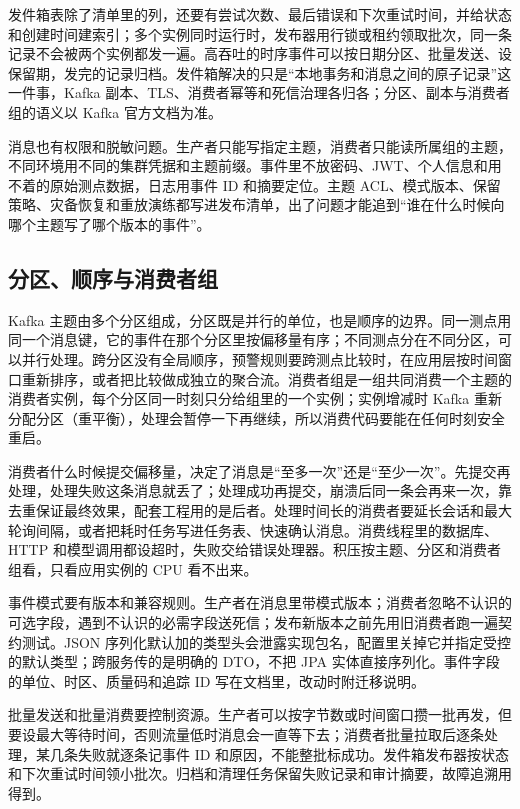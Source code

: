 发件箱表除了清单里的列，还要有尝试次数、最后错误和下次重试时间，并给状态和创建时间建索引；多个实例同时运行时，发布器用行锁或租约领取批次，同一条记录不会被两个实例都发一遍。高吞吐的时序事件可以按日期分区、批量发送、设保留期，发完的记录归档。发件箱解决的只是“本地事务和消息之间的原子记录”这一件事，Kafka 副本、TLS、消费者幂等和死信治理各归各；分区、副本与消费者组的语义以 Kafka 官方文档为准\cite{kafkaDocs}。

消息也有权限和脱敏问题。生产者只能写指定主题，消费者只能读所属组的主题，不同环境用不同的集群凭据和主题前缀。事件里不放密码、JWT、个人信息和用不着的原始测点数据，日志用事件 ID 和摘要定位。主题 ACL、模式版本、保留策略、灾备恢复和重放演练都写进发布清单，出了问题才能追到“谁在什么时候向哪个主题写了哪个版本的事件”。

\subsection{分区、顺序与消费者组}

Kafka 主题由多个分区组成，分区既是并行的单位，也是顺序的边界。同一测点用同一个消息键，它的事件在那个分区里按偏移量有序；不同测点分在不同分区，可以并行处理。跨分区没有全局顺序，预警规则要跨测点比较时，在应用层按时间窗口重新排序，或者把比较做成独立的聚合流。消费者组是一组共同消费一个主题的消费者实例，每个分区同一时刻只分给组里的一个实例；实例增减时 Kafka 重新分配分区（重平衡），处理会暂停一下再继续，所以消费代码要能在任何时刻安全重启。

消费者什么时候提交偏移量，决定了消息是“至多一次”还是“至少一次”。先提交再处理，处理失败这条消息就丢了；处理成功再提交，崩溃后同一条会再来一次，靠去重保证最终效果，配套工程用的是后者。处理时间长的消费者要延长会话和最大轮询间隔，或者把耗时任务写进任务表、快速确认消息。消费线程里的数据库、HTTP 和模型调用都设超时，失败交给错误处理器。积压按主题、分区和消费者组看，只看应用实例的 CPU 看不出来。

事件模式要有版本和兼容规则。生产者在消息里带模式版本；消费者忽略不认识的可选字段，遇到不认识的必需字段送死信；发布新版本之前先用旧消费者跑一遍契约测试。JSON 序列化默认加的类型头会泄露实现包名，配置里关掉它并指定受控的默认类型；跨服务传的是明确的 DTO，不把 JPA 实体直接序列化。事件字段的单位、时区、质量码和追踪 ID 写在文档里，改动时附迁移说明。

批量发送和批量消费要控制资源。生产者可以按字节数或时间窗口攒一批再发，但要设最大等待时间，否则流量低时消息会一直等下去；消费者批量拉取后逐条处理，某几条失败就逐条记事件 ID 和原因，不能整批标成功。发件箱发布器按状态和下次重试时间领小批次。归档和清理任务保留失败记录和审计摘要，故障追溯用得到。


